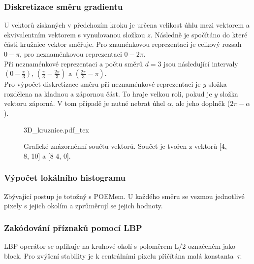 \documentclass[czech,BP]{thesiskiv}
\begin{document}
\subsubsection{Diskretizace směru gradientu}
U vektorů získaných v předchozím kroku je určena velikost úhlu mezi vektorem a ekvivalentním vektorem s vynulovanou složkou $z$. Následně je spočítáno do které části kružnice vektor směřuje. Pro znaménkovou reprezentaci je celkový rozsah $0 - \pi$, pro neznaménkovou reprezentaci $0 - 2\pi$.
\\
Při neznaménkové reprezentaci a počtu směrů $d = 3$ jsou následující intervaly $\left(0 - \frac{\pi}{3}\right)$, $\left(\frac{\pi}{3} - \frac{2\pi}{3}\right)$ a  $\left(\frac{2\pi}{3} - \pi\right)$.
\\
Pro výpočet diskretizace směru při neznaménkové reprezentaci je $y$ složka rozdělena na kladnou a zápornou část. To hraje velkou roli, pokud je $y$ složka vektoru záporná. V tom případě je nutné nebrat úhel $\alpha$, ale jeho doplněk ($ 2\pi - \alpha$).

\begin{figure}[H]
    \centering
    \def\svgwidth{\columnwidth}
    {3D_kruznice.pdf_tex} 
    \caption{Grafické znázorněnní součtu vektorů. Součet je tvořen z vektorů [4, 8, 10] a [8 4, 0].}
\end{figure}

\subsubsection{Výpočet lokálního histogramu}
\par Zbývající postup je totožný s POEMem. U každého směru se vezmou jednotlivé pixely s jejich okolím a zprůměrují se jejich hodnoty. 

\subsubsection{Zakódování příznaků pomocí LBP}
\par LBP operátor se aplikuje na kruhové okolí s poloměrem L/2 označeném jako block. Pro zvýšení stability je k centrálními pixelu přičítána malá konstanta~$\tau$. 
\end{document}
